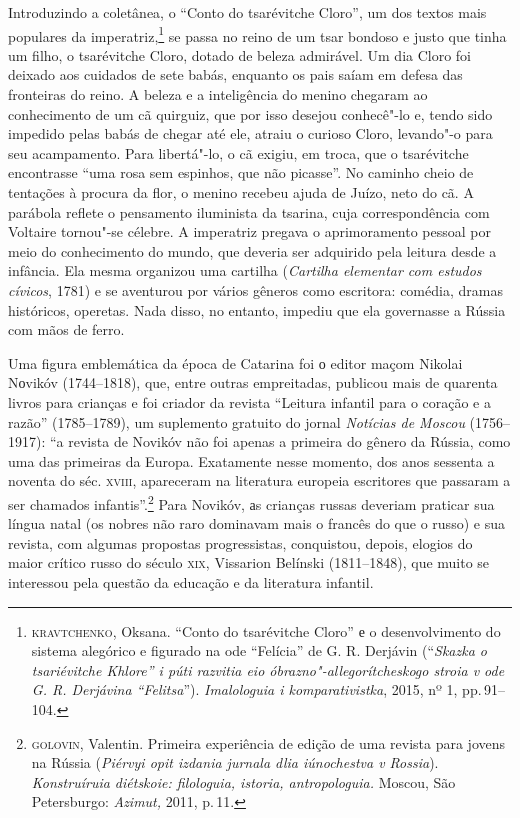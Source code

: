 Introduzindo a coletânea, o ``Conto do tsarévitche
Cloro'', um dos textos mais populares da imperatriz,\footnote{\textsc{kravtchenko},
  Oksana. ``Conto do tsarévitche Cloro'' е o desenvolvimento do sistema
  alegórico e figurado na ode ``Felícia'' de G. R. Derjávin
  (``\emph{Skazka o tsariévitche Khlore'' i púti razvitia eio
  óbrazno"-allegorítcheskogo stroia v ode G. R. Derjávina ``Felitsa}'').
  \emph{Imalologuia i komparativistka}, 2015, nº 1, pp.\,91--104.} se passa
no reino de um tsar bondoso e justo que tinha um filho, o tsarévitche
Cloro, dotado de beleza admirável. Um dia Cloro foi deixado aos cuidados
de sete babás, enquanto os pais saíam em defesa das fronteiras do reino.
A beleza e a inteligência do menino chegaram ao conhecimento de um cã
quirguiz, que por isso desejou conhecê"-lo e, tendo sido impedido pelas
babás de chegar até ele, atraiu o curioso Cloro, levando"-o para seu
acampamento. Para libertá"-lo, o cã exigiu, em troca, que o tsarévitche
encontrasse ``uma rosa sem espinhos, que não picasse''. No caminho cheio
de tentações à procura da flor, o menino recebeu ajuda de Juízo, neto do
cã. A parábola reflete o pensamento iluminista da tsarina, cuja
correspondência com Voltaire tornou"-se célebre. A imperatriz pregava o
aprimoramento pessoal por meio do conhecimento do mundo, que deveria ser
adquirido pela leitura desde a infância. Ela mesma organizou uma
cartilha (\emph{Cartilha elementar com estudos cívicos}, 1781) e se
aventurou por vários gêneros como escritora: comédia, dramas históricos,
operetas. Nada disso, no entanto, impediu que ela governasse a Rússia
com mãos de ferro.

Uma figura emblemática da época de Catarina foi о editor maçom Nikolai
Nоvikóv (1744--1818), que, entre outras empreitadas, publicou mais de
quarenta livros para crianças e foi criador da revista ``Leitura
infantil para o coração e a razão'' (1785--1789), um suplemento gratuito
do jornal \emph{Notícias de Moscou} (1756--1917): ``a revista de Novikóv
não foi apenas a primeira do gênero da Rússia, como uma das primeiras da
Europa. Exatamente nesse momento, dos anos sessenta a noventa do séc.
\textsc{xviii}, apareceram na literatura europeia escritores que passaram a ser
chamados infantis''.\footnote{\textsc{golovin}, Valentin. Primeira experiência de
  edição de uma revista para jovens na Rússia (\emph{Piérvyi opit
  izdania jurnala dlia iúnochestva v Rossia}). \emph{Konstruíruia
  diétskoie: filologuia, istoria, antropologuia.} Moscou, São
  Petersburgo: \emph{Azimut,} 2011, p.\,11.} Para Novikóv, аs crianças
russas deveriam praticar sua língua natal (os nobres não raro dominavam
mais o francês do que o russo) e sua revista, com algumas propostas
progressistas, conquistou, depois, elogios do maior crítico
russo do século \textsc{xix}, Vissarion Belínski (1811--1848), que muito se
interessou pela questão da educação e da literatura infantil.

